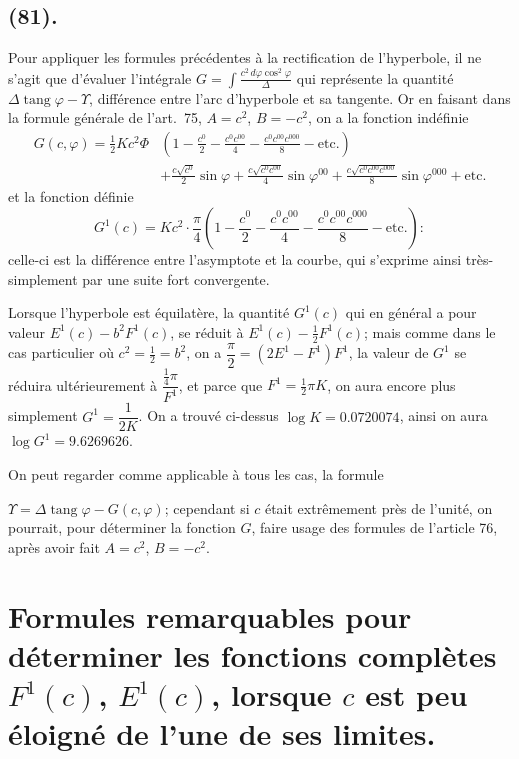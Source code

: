 \documentclass{article}
\begin{document}
\subsection*{(81).}

Pour appliquer les formules précédentes à la rectification de l'hyperbole, il ne s'agit que d'évaluer l'intégrale $G=\displaystyle\int\frac{c^{2}\,d\varphi\cos^{2}\varphi}{\Delta}$ qui représente la quantité $\Delta\operatorname{tang}\varphi-\Upsilon$, différence entre l'arc d'hyperbole et sa tangente. Or en faisant dans la formule générale de l'art.~75, $A=c^{2}$, $B=-c^{2}$, on a la fonction indéfinie
\[ \begin{aligned} G(c,\varphi)=\tfrac{1}{2}Kc^{2}\Phi&\left(1-\frac{c^{0}}{2}-\frac{c^{0}c^{00}}{4}-\frac{c^{0}c^{00}c^{000}}{8}-\text{etc.}\right)\\ &+\frac{c\sqrt{c^{0}}}{2}\sin\varphi+\frac{c\sqrt{c^{0}c^{00}}}{4}\sin\varphi^{00}+\frac{c\sqrt{c^{0}c^{00}c^{000}}}{8}\sin\varphi^{000}+\text{etc.} \end{aligned} \]
et la fonction définie
\[ G^{1}(c)=Kc^{2}\cdot\frac{\pi}{4}\left(1-\frac{c^{0}}{2}-\frac{c^{0}c^{00}}{4}-\frac{c^{0}c^{00}c^{000}}{8}-\text{etc.}\right): \]
celle-ci est la différence entre l'asymptote et la courbe, qui s'exprime ainsi très-simplement par une suite fort convergente.

Lorsque l'hyperbole est équilatère, la quantité $G^{1}(c)$ qui en général a pour valeur $E^{1}(c)-b^{2}F^{1}(c)$, se réduit à $E^{1}(c)-\frac{1}{2}F^{1}(c)$; mais comme dans le cas particulier où $c^{2}=\frac{1}{2}=b^{2}$, on a $\dfrac{\pi}{2}=(2E^{1}-F^{1})F^{1}$, la valeur de $G^{1}$ se réduira ultérieurement à $\dfrac{\frac{1}{4}\pi}{F^{1}}$, et parce que $F^{1}=\frac{1}{2}\pi K$, on aura encore plus simplement $G^{1}=\dfrac{1}{2K}$. On a trouvé ci-dessus $\log K=0.0720074$, ainsi on aura $\log G^{1}=9.6269626$.

On peut regarder comme applicable à tous les cas, la formule

$\Upsilon=\Delta\operatorname{tang}\varphi-G(c,\varphi)$; cependant si $c$ était extrêmement près de l'unité, on pourrait, pour déterminer la fonction $G$, faire usage des formules de l'article 76, après avoir fait $A=c^{2}$, $B=-c^{2}$.

\section*{Formules remarquables pour déterminer les fonctions complètes $F^{1}(c)$, $E^{1}(c)$, lorsque $c$ est peu éloigné de l'une de ses limites.}
\end{document}
